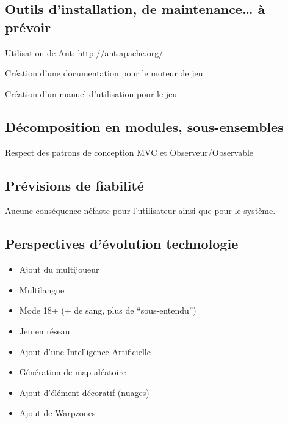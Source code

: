 \documentclass[11pt]{report}
\begin{document}
			\subsection{Outils d’installation, de maintenance… à prévoir}
			
				Utilisation de Ant: \url{http://ant.apache.org/}
				
           		Création d’une documentation pour le moteur de jeu
           		
           		Création d’un manuel d’utilisation pour le jeu
           	
           	\subsection{Décomposition en modules, sous-ensembles}
           	
           		Respect des patrons de conception MVC et Observeur/Observable
           		
           	\subsection{Prévisions de fiabilité}
           	
           		Aucune conséquence néfaste pour l’utilisateur ainsi que pour le système.
           	
           	\subsection{Perspectives d’évolution technologie}
           	
           		\begin{itemize}
           			\item Ajout du multijoueur
					\item Multilangue
					\item Mode 18+ (+ de sang, plus de “sous-entendu”)
				    \item Jeu en réseau
				    \item Ajout d’une Intelligence Artificielle
				    \item Génération de map aléatoire
				    \item Ajout d’élément décoratif (nuages)
				    \item Ajout de Warpzones
		        \end{itemize}
\end{document}
